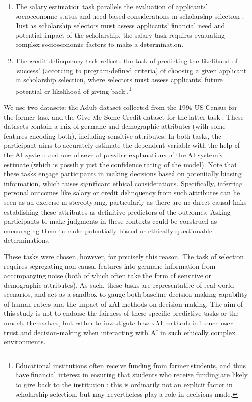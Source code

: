\begin{enumerate}
    \item The salary estimation task parallels the evaluation of applicants' socioeconomic status and need-based considerations in scholarship selection \cite{Warikoo_2019}. Just as scholarship selectors must assess applicants' financial need and potential impact of the scholarship, the salary task requires evaluating complex socioeconomic factors to make a determination.
    \item The credit delinquency task reflects the task of predicting the likelihood of `success' (according to program-defined criteria) of choosing a given applicant in scholarship selection, where selectors must assess applicants' future potential or likelihood of giving back \cite{schumann2017diverse}.\footnote{Educational institutions often receive funding from former students, and thus have financial interest in ensuring that students who receive funding are likely to give back to the institution \cite{citation_needed}; this is ordinarily not an explicit factor in scholarship selection, but may nevertheless play a role in decisions made.}
\end{enumerate}

We use two datasets: the Adult dataset collected from the 1994 US Census for the former task and the Give Me Some Credit dataset for the latter task \cite{kohavi_scaling_1996, GiveMeSomeCredit}. These datasets contain a mix of germane and demographic attributes (with some features encoding both), including sensitive attributes. In both tasks, the participant aims to accurately estimate the dependent variable with the help of the AI system and one of several possible explanations of the AI system's estimate (which is possibly just the confidence rating of the model). Note that these tasks engage participants in making decisions based on potentially biasing information, which raises significant ethical considerations. Specifically, inferring personal outcomes like salary or credit delinquency from such attributes can be seen as an exercise in stereotyping, particularly as there are no direct causal links establishing these attributes as definitive predictors of the outcomes. Asking participants to make judgments in these contexts could be construed as encouraging them to make potentially biased or ethically questionable determinations.

These tasks were chosen, however, for precisely this reason. The task of selection requires segregating non-causal features into germane information from accompanying noise (both of which often take the form of sensitive or demographic attributes). As such, these tasks are representative of real-world scenarios, and act as a sandbox to gauge both baseline decision-making capability of human raters and the impact of xAI methods on decision-making. The aim of this study is not to endorse the fairness of these specific predictive tasks or the models themselves, but rather to investigate how xAI methods influence user trust and decision-making when interacting with AI in such ethically complex environments. 

